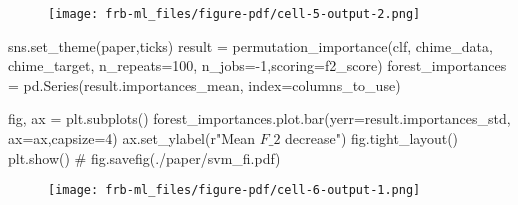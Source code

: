 \documentclass[
  letterpaper,
  DIV=11,
  numbers=noendperiod]{scrartcl}
\newenvironment{Shaded}{\begin{snugshade}}{\end{snugshade}}
\newcommand{\CommentTok}[1]{\textcolor[rgb]{0.37,0.37,0.37}{#1}}
\newcommand{\DecValTok}[1]{\textcolor[rgb]{0.68,0.00,0.00}{#1}}
\newcommand{\NormalTok}[1]{\textcolor[rgb]{0.00,0.23,0.31}{#1}}
\newcommand{\OperatorTok}[1]{\textcolor[rgb]{0.37,0.37,0.37}{#1}}
\newcommand{\StringTok}[1]{\textcolor[rgb]{0.13,0.47,0.30}{#1}}
\newcommand{\VerbatimStringTok}[1]{\textcolor[rgb]{0.13,0.47,0.30}{#1}}
\begin{document}
\begin{figure}[H]

{\centering \texttt{[image: frb-ml\_files/figure-pdf/cell-5-output-2.png]}

}

\end{figure}

\begin{Shaded}
\begin{Highlighting}[]
\NormalTok{sns.set\_theme(}\StringTok{\textquotesingle{}paper\textquotesingle{}}\NormalTok{,}\StringTok{\textquotesingle{}ticks\textquotesingle{}}\NormalTok{)}
\NormalTok{result }\OperatorTok{=}\NormalTok{ permutation\_importance(clf, chime\_data, chime\_target, n\_repeats}\OperatorTok{=}\DecValTok{100}\NormalTok{, n\_jobs}\OperatorTok{={-}}\DecValTok{1}\NormalTok{,scoring}\OperatorTok{=}\NormalTok{f2\_score)}
\NormalTok{forest\_importances }\OperatorTok{=}\NormalTok{ pd.Series(result.importances\_mean, index}\OperatorTok{=}\NormalTok{columns\_to\_use)}

\NormalTok{fig, ax }\OperatorTok{=}\NormalTok{ plt.subplots()}
\NormalTok{forest\_importances.plot.bar(yerr}\OperatorTok{=}\NormalTok{result.importances\_std, ax}\OperatorTok{=}\NormalTok{ax,capsize}\OperatorTok{=}\DecValTok{4}\NormalTok{)}
\NormalTok{ax.set\_ylabel(}\VerbatimStringTok{r"Mean $F\_2$ decrease"}\NormalTok{)}
\NormalTok{fig.tight\_layout()}
\NormalTok{plt.show()}
\CommentTok{\# fig.savefig(\textquotesingle{}./paper/svm\_fi.pdf\textquotesingle{})}
\end{Highlighting}
\end{Shaded}

\begin{figure}[H]

{\centering \texttt{[image: frb-ml\_files/figure-pdf/cell-6-output-1.png]}

}

\end{figure}
\end{document}
